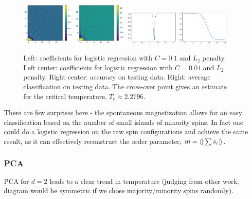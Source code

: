 \documentclass[11pt]{article}
\begin{document}
\begin{figure}[h]
    \centering
    \includegraphics[width=0.24\textwidth]{ising_images/logreg_2d_ising}
    \includegraphics[width=0.24\textwidth]{ising_images/logreg2_2d_ising}
    \includegraphics[width=0.24\textwidth]{ising_images/logreg_acc_2d_ising}
    \includegraphics[width=0.24\textwidth]{ising_images/logreg_avg_2d_ising}
    \caption{Left: coefficients for logistic regression with $C=0.1$ and $L_2$ penalty. Left center: coefficients for logistic regression with $C=0.01$ and $L_2$ penalty. Right center: accuracy on testing data. Right: average classification on testing data. The cross-over point gives an estimate for the critical temperature, $T_\text{c}\approx 2.2796$.}
    \label{fig:IsingLogReg}
\end{figure}

There are few surprises here - the spontaneous magnetization allows for an easy classification based on the number of small islands of minority spins. In fact one could do a logistic regression on the raw spin configurations and achieve the same result, as it can effectively reconstruct the order parameter, $m=\ev{|\sum s_i|}$.

\subsubsection{PCA}
PCA for $d=2$ leads to a clear trend in temperature (judging from other work, diagram would be symmetric if we chose majority/minority spins randomly).
\end{document}
